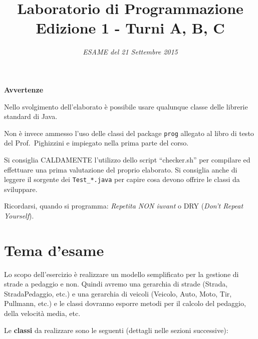 \documentclass[a4paper]{article}
\title{Laboratorio di Programmazione\\
Edizione 1 - Turni A, B, C}
\date{\textit{ESAME del 21 Settembre 2015}}
\begin{document}
\maketitle


\hrulefill

\textbf{Avvertenze}

\begin{compactitem}
\item 
Nello svolgimento dell'elaborato è possibile
usare qualunque classe delle librerie standard di Java.

\item Non è invece
ammesso l'uso delle classi del package {\tt prog} allegato al libro di
testo del Prof.~Pighizzini e impiegato nella prima parte del corso.

\item Si consiglia CALDAMENTE l'utilizzo dello script ``checker.sh'' per 
compilare ed effettuare una prima valutazione del proprio elaborato.
Si consiglia anche di leggere il sorgente dei \texttt{Test\_*.java} per 
capire cosa devono offrire le classi da sviluppare.

\item Ricordarsi, quando si programma: \emph{Repetita NON iuvant} o DRY (\emph{Don't Repeat Yourself}).

\end{compactitem}


\hrulefill
\section*{Tema d'esame}

Lo scopo dell'esercizio è realizzare un modello semplificato per la gestione di 
strade a pedaggio e non. Quindi avremo una gerarchia di strade (Strada, 
StradaPedaggio, etc.) e una gerarchia di veicoli (Veicolo, Auto, Moto, Tir, 
Pullmann, etc.) e le classi dovranno esporre metodi per il calcolo del 
pedaggio, della velocità media, etc.

Le \textbf{classi} da realizzare sono le seguenti (dettagli nelle sezioni 
successive):
\medskip
\end{document}
